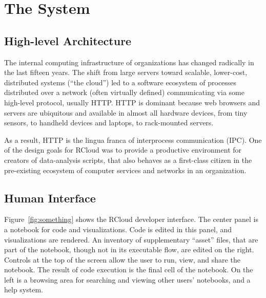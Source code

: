 \section{The System\label{sec:system}}

\subsection{High-level Architecture\label{sec:highlevelarchitecture}}


The internal computing infrastructure of organizations has changed
radically in the last fifteen years. The shift from large
servers toward scalable, lower-cost, distributed systems (``the cloud'')
led to a software ecosystem of processes distributed over a
network (often virtually defined) communicating via some
high-level protocol, usually HTTP. HTTP is dominant because web
browsers and servers are ubiquitous and available in almost
all hardware devices, from tiny sensors, to handheld devices and
laptops, to rack-mounted servers.

As a result, HTTP is the lingua franca of interprocess communication
(IPC). One of the design goals for RCloud was to provide a productive
environment for creators of data-analysis scripts, that also behaves
as a first-class citizen in the pre-existing ecosystem of computer
services and networks in an organization.


\subsection{Human Interface\label{sec:humaninterface}}


Figure~\ref{fig:something} shows the RCloud developer interface.
The center panel is a notebook for code and visualizations.
Code is edited in this panel, and visualizations are rendered.
An inventory of supplementary ``asset'' files, that are part of
the notebook, though not in its executable flow, are edited on the right.
Controls at the top of the screen allow the user to run, view, and
share the notebook. The result of code execution is the final cell of
the notebook.  On the left is a browsing area for searching and viewing
other users' notebooks, and a help system.

